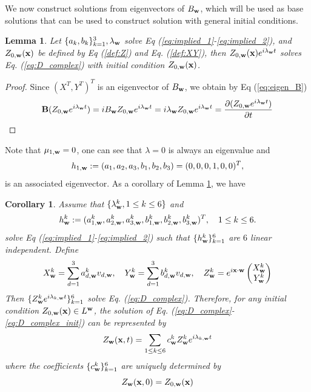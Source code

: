 \documentclass[10pt,reqno]{amsart}
\newcommand{\bB}{{\bf B}}
\renewcommand{\(}{\left(}
\renewcommand{\)}{\right)}
\newcommand{\bw}{{\bf w}}
\newcommand{\bx}{\mathbf{x}}
\newtheorem{lem}[theo]{Lemma}
\newtheorem{cor}[theo]{Corollary}
\numberwithin{equation}{section}
\begin{document}
\fi
We now construct solutions from eigenvectors of $B_{\bw}$, which will be used as base solutions that can be used to construct solution with general initial conditions. 
\begin{lem}\label{prop:base_sol} Let $\{a_k, b_k\}_{k=1}^3, \lambda_{\bw}$ solve Eq (\ref{eq:implied_1}-\ref{eq:implied_2}), and $Z_{0,\bw}(\bx)$ be defined by Eq (\ref{def:Z}) and Eq. (\ref{def:XY}), then $Z_{0,\bw}(\bx)e^{i\lambda_{\bw} t}$ solves Eq. (\ref{eq:D_complex}) with initial condition $Z_{0,\bw}(\bx)$.
\end{lem}
\begin{proof}
	Since $(X^T,Y^T)^T$ is an eigenvector of $B_{\bw}$,  we obtain by Eq (\ref{eq:eigen_B})
	\[
	\bB (Z_{0,\bw}e^{i\lambda_{\bw} t})  = iB_{\bw} Z_{0,\bw}e^{i\lambda_{\bw} t}  = i\lambda_{\bw} Z_{0,\bw}e^{i\lambda_{\bw} t} =\frac{\partial{(Z_{0,\bw}e^{i\lambda_{\bw} t})}}{\partial t} 
	\]
\end{proof}
Note that $\mu_{1,\bw}=0$,  one can see that $\lambda=0$ is always an eigenvalue and 
\[
h_{1,\bw}:=(a_1,a_2,a_3,b_1,b_2,b_3) =(0,0,0,1,0,0)^T,
\]
is an associated eigenvector.  
As a corollary of Lemma \ref{prop:base_sol}, we have
\begin{cor}\label{prop:solution_Lw} Assume that $\{\lambda^k_{\bw}, 1\le k\le 6\}$ and
\[  
h^k_{\bw} := (a^k_{1,\bw}, a^k_{2,\bw}, a^k_{3,\bw}, b^k_{1,\bw}, b^k_{2,\bw}, b^k_{3,\bw})^T , \quad 1\le k\le 6.
\]
solve Eq (\ref{eq:implied_1}-\ref{eq:implied_2}) such that $\{h^k_{\bw}\}_{k=1}^6$ are $6$ linear independent.  Define
\begin{equation}\label{def:Z^k_w}
	X^k_{\bw}=\sum_{d=1}^3 a^k_{d,\bw} v_{d,\bw},  \quad Y^k_{\bw}=\sum_{d=1}^3 b^k_{d,\bw} v_{d,\bw}, \quad Z^k_{\bw}=e^{i\bx\cdot \bw}\begin{pmatrix}
		X^k_{\bw}  \\
		Y^k_{\bw}
	\end{pmatrix}
\end{equation}
Then  $\{Z^k_{\bw} e^{i \lambda_{k,\bw} t}\}_{k=1}^6$ solve Eq. (\ref{eq:D_complex}).  Therefore, for any initial condition $Z_{0,\bw}(\bx) \in L^{\bw}$,  the solution of Eq. (\ref{eq:D_complex}-\ref{eq:D_complex_init}) can be represented by 
\begin{equation}\label{eq:Z_w}
Z_{\bw}(\bx, t)  = \sum_{1\le k\le 6} c^k_{\bw} Z^k_{\bw} e^{i \lambda_{k,\bw} t}
\end{equation}
where the coefficients $\{c^k_{\bw}\}_{k=1}^6$ are uniquely determined by 
\[
Z_{\bw}(\bx, 0) = Z_{0,\bw}(\bx)
\]
\end{cor}
\end{document}
